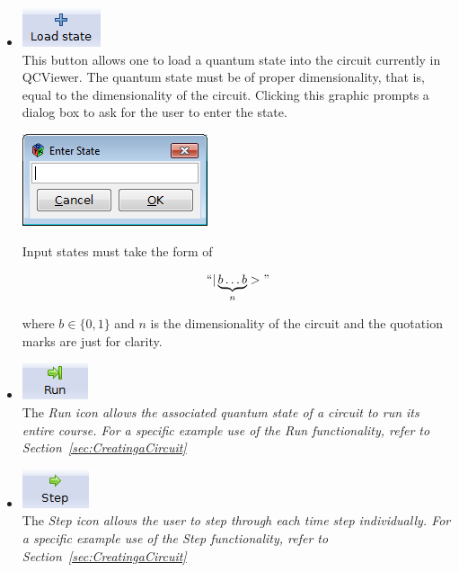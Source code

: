 \documentclass[10pt]{article}
\theoremstyle{definition}
\begin{document}
\begin{itemize}
\item \includegraphics{Figures/Navigation/LoadState.png} \\ 

This button allows one to load a quantum state into the circuit currently in QCViewer. The quantum state must be of proper dimensionality, that is, equal to the dimensionality of the circuit. Clicking this graphic prompts a dialog box to ask for the user to enter the state. 

\begin{center}
\includegraphics{Figures/Navigation/LoadStateDialog.png}
\end{center}

Input states must take the form of 

\begin{eqnarray}
``| \underbrace{b \dots b}_n >"  
\end{eqnarray}

where $b \in \{0,1\}$ and $n$ is the dimensionality of the circuit and the quotation marks are just for clarity.

\item \includegraphics{Figures/Navigation/Run.png}\\

The \em Run \em icon allows the associated quantum state of a circuit to run its entire course. For a specific example use of the \em Run \em functionality, refer to Section~\ref{sec:CreatingaCircuit}

\item \includegraphics{Figures/Navigation/Step.png}\\

The \em Step \em icon allows the user to step through each time step individually. For a specific example use of the \em Step \em functionality, refer to Section~\ref{sec:CreatingaCircuit}


\end{itemize}
\end{document}
